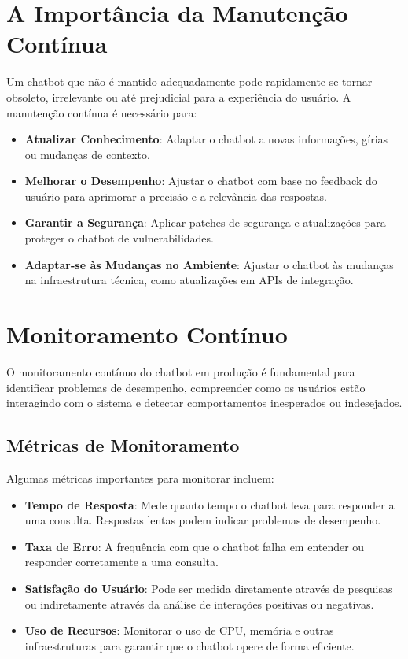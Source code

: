 \documentclass[14pt,a4paper,oneside]{book}
\begin{document}
\section{A Importância da Manutenção Contínua}

Um chatbot que não é mantido adequadamente pode rapidamente se tornar obsoleto, irrelevante ou até prejudicial para a experiência do usuário. A manutenção contínua é necessário para:

\begin{itemize}
	\item \textbf{Atualizar Conhecimento}: Adaptar o chatbot a novas informações, gírias ou mudanças de contexto.
	\item \textbf{Melhorar o Desempenho}: Ajustar o chatbot com base no feedback do usuário para aprimorar a precisão e a relevância das respostas.
	\item \textbf{Garantir a Segurança}: Aplicar patches de segurança e atualizações para proteger o chatbot de vulnerabilidades.
	\item \textbf{Adaptar-se às Mudanças no Ambiente}: Ajustar o chatbot às mudanças na infraestrutura técnica, como atualizações em APIs de integração.
\end{itemize}

\section{Monitoramento Contínuo}

O monitoramento contínuo do chatbot em produção é fundamental para identificar problemas de desempenho, compreender como os usuários estão interagindo com o sistema e detectar comportamentos inesperados ou indesejados.

\subsection{Métricas de Monitoramento}

Algumas métricas importantes para monitorar incluem:

\begin{itemize}
	\item \textbf{Tempo de Resposta}: Mede quanto tempo o chatbot leva para responder a uma consulta. Respostas lentas podem indicar problemas de desempenho.
	\item \textbf{Taxa de Erro}: A frequência com que o chatbot falha em entender ou responder corretamente a uma consulta.
	\item \textbf{Satisfação do Usuário}: Pode ser medida diretamente através de pesquisas ou indiretamente através da análise de interações positivas ou negativas.
	\item \textbf{Uso de Recursos}: Monitorar o uso de CPU, memória e outras infraestruturas para garantir que o chatbot opere de forma eficiente.
\end{itemize}
\end{document}

